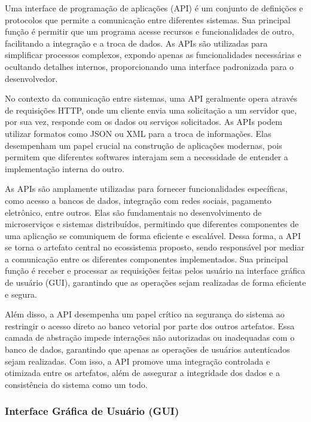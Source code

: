 \documentclass[a4paper, 12pt]{article}
\begin{document}
    Uma interface de programação de aplicações (API) é um conjunto de definições e protocolos que permite a comunicação entre diferentes sistemas. Sua principal função é permitir que um programa acesse recursos e funcionalidades de outro, facilitando a integração e a troca de dados. As APIs são utilizadas para simplificar processos complexos, expondo apenas as funcionalidades necessárias e ocultando detalhes internos, proporcionando uma interface padronizada para o desenvolvedor.

    No contexto da comunicação entre sistemas, uma API geralmente opera através de requisições HTTP, onde um cliente envia uma solicitação a um servidor que, por sua vez, responde com os dados ou serviços solicitados. As APIs podem utilizar formatos como JSON ou XML para a troca de informações. Elas desempenham um papel crucial na construção de aplicações modernas, pois permitem que diferentes softwares interajam sem a necessidade de entender a implementação interna do outro.

    As APIs são amplamente utilizadas para fornecer funcionalidades específicas, como acesso a bancos de dados, integração com redes sociais, pagamento eletrônico, entre outros. Elas são fundamentais no desenvolvimento de microserviços e sistemas distribuídos, permitindo que diferentes componentes de uma aplicação se comuniquem de forma eficiente e escalável. Dessa forma, a API se torna o artefato central no ecossistema proposto, sendo responsável por mediar a comunicação entre os diferentes componentes implementados. Sua principal função é receber e processar as requisições feitas pelos usuário na interface gráfica de usuário (GUI), garantindo que as operações sejam realizadas de forma eficiente e segura.
    
    Além disso, a API desempenha um papel crítico na segurança do sistema ao restringir o acesso direto ao banco vetorial por parte dos outros artefatos. Essa camada de abstração impede interações não autorizadas ou inadequadas com o banco de dados, garantindo que apenas as operações de usuários autenticados sejam realizadas. Com isso, a API promove uma integração controlada e otimizada entre os artefatos, além de assegurar a integridade dos dados e a consistência do sistema como um todo.
    
    \subsubsection{Interface Gráfica de Usuário (GUI)} \label{sec:gui}
    
\end{document}
